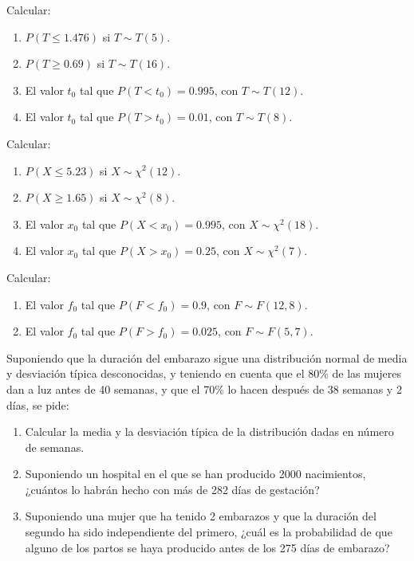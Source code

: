 {Calcular:
\begin{enumerate}
\item  $P(T\leq 1.476)$ si $T\sim T(5)$.
\item  $P(T\geq 0.69)$ si $T\sim T(16)$.
\item  El valor $t_{0}$ tal que $P(T<t_{0})=0.995$, con $T\sim T(12)$.
\item  El valor $t_{0}$ tal que $P(T>t_{0})=0.01$, con $T\sim T(8)$.
\end{enumerate}
}
{}
{}


{Calcular:

\begin{enumerate}
\item  $P(X\leq 5.23)$ si $X\sim \chi ^{2}(12)$.
\item  $P(X\geq 1.65)$ si $X\sim \chi ^{2}(8)$.
\item  El valor $x_{0}$ tal que $P(X<x_{0})=0.995$, con $X\sim \chi ^{2}(18)$.
\item  El valor $x_{0}$ tal que $P(X>x_{0})=0.25$, con $X\sim \chi ^{2}(7)$.
\end{enumerate}
}
{}
{}


{Calcular:

\begin{enumerate}
\item  El valor $f_{0}$ tal que $P(F<f_{0})=0.9$, con $F\sim F(12,8)$.
\item  El valor $f_{0}$ tal que $P(F>f_{0})=0.025$, con $F\sim F(5,7)$.
\end{enumerate}
}
{}
{}


{Suponiendo que la duración del embarazo sigue una distribución normal de media y desviación típica desconocidas, y
teniendo en cuenta que el 80\% de las mujeres dan a luz antes de 40 semanas, y que el 70\% lo hacen después de 38
semanas y 2 días, se pide:

\begin{enumerate}
\item Calcular la media y la desviación típica de la distribución dadas en número de semanas.\\
\item Suponiendo un hospital en el que se han producido 2000 nacimientos, ¿cuántos lo habrán hecho con más de 282 días de gestación?
\item Suponiendo una mujer que ha tenido 2 embarazos y que la duración del segundo ha sido independiente del primero, ¿cuál es la probabilidad de que alguno de los partos se haya producido antes de los 275 días de embarazo?
\end{enumerate}
}
{}
{}


